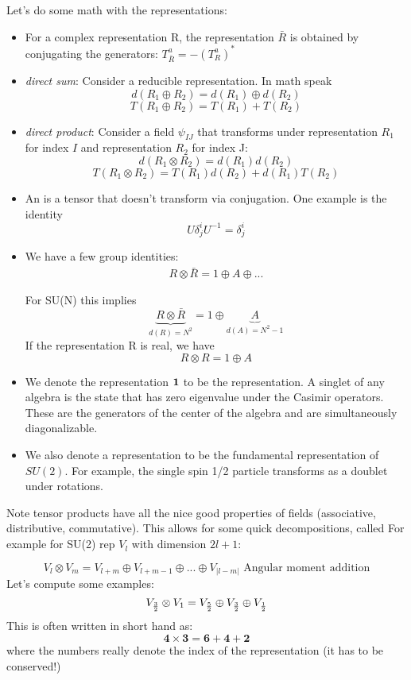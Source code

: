 \documentclass[11pt]{scrartcl}
\begin{document}
Let's do some math with the representations:
\begin{itemize}
	\item For a complex representation R, the  representation $\bar{R}$  is obtained by conjugating the generators:
	$T^a_{\bar{R}} = -(T^a_R)^*$
	\item \emph{direct sum}: Consider a reducible representation.  In math speak
	\[ d(R_1 \oplus R_2) = d(R_1) \oplus d(R_2) \]
	\[T(R_1 \oplus R_2) = T(R_1) + T(R_2) \]
	\item \emph{direct product}: Consider a field $\psi_{IJ}$ that transforms under representation $R_1$ for index $I$ and representation $R_2$ for index J:
	\[d(R_1 \otimes R_2) = d(R_1)d(R_2) \]
	\[T(R_1 \otimes R_2)= T(R_1) d(R_2) + d(R_1) T(R_2) \]
	\item An  is a tensor that doesn't transform via conjugation.  One example is the identity
	\[U \delta^{i}_j U^{-1} = \delta^{i}_j\]
	\item We have a few group identities:
	\begin{align}
		R \otimes \bar{R} = 1 \oplus A \oplus ...
		\end{align}
	
	For SU(N) this implies 
	\[\underbrace{R \otimes \bar{R}}_{d(R) = N^2} = 1 \oplus \underbrace{A}_{d(A) = N^2-1} \]
	If the representation R is real, we have
	\[ R \otimes R = 1 \oplus A \]
	
	\item We denote the representation $\bf{1}$ to be the  representation.  A singlet of any algebra is the state that has zero eigenvalue under the Casimir operators. These are the generators of the center of the algebra and are simultaneously diagonalizable.
	\item We also denote a  representation to be the fundamental representation of $SU(2)$.  For example, the single spin 1/2 particle transforms as a doublet under rotations.
\end{itemize}

Note tensor products have all the nice good properties of fields (associative, distributive, commutative).  This allows for some quick decompositions, called   For example for SU(2) rep
$V_l$ with dimension $2l+1$:

\[ V_{l} \otimes V_{m} = V_{l+m} \oplus V_{l+m-1} \oplus ... \oplus V_{|l-m|} \text{ Angular moment addition} \]
Let's compute some examples:
\[V_{3 \over 2} \otimes V_{1} = V_{5 \over 2} \oplus V_{3 \over 2} \oplus V_{1 \over 2} \]
This is often written in short hand as:
\[ \mathbf{4} \times \mathbf{3} = \mathbf{6} + \mathbf{4} + \mathbf{2} \]
where the numbers really denote the index of the representation (it has to be conserved!)
\end{document}

